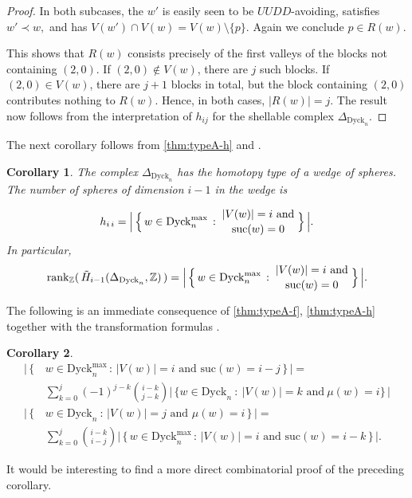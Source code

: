 \documentclass[11pt]{amsart}
\def\Dyck{\mathrm{Dyck}}
\def\rk{\mathrm{rank}}
\def\ZZ{\mathbb{Z}}
\def\suc{\mathrm{suc}}
\theoremstyle{plain}
\numberwithin{lemma}{\DefaultNumberTheoremWithin}
\numberwithin{theorem}{\DefaultNumberTheoremWithin}
\newtheorem{corollary}{Corollary}
\numberwithin{corollary}{\DefaultNumberTheoremWithin}
\numberwithin{proposition}{\DefaultNumberTheoremWithin}
\numberwithin{conjecture}{\DefaultNumberTheoremWithin}
\theoremstyle{definition}
\numberwithin{definition}{\DefaultNumberTheoremWithin}
\numberwithin{question}{\DefaultNumberTheoremWithin}
\numberwithin{problem}{\DefaultNumberTheoremWithin}
\theoremstyle{remark}
\numberwithin{remark}{\DefaultNumberTheoremWithin}
\numberwithin{example}{\DefaultNumberTheoremWithin}
\numberwithin{claim}{\DefaultNumberTheoremWithin}
\begin{document}
\begin{proof}
In both subcases, the $w'$ is easily seen to be $UUDD$-avoiding,
satisfies
$w'\prec w,$
and has
$V(w')\cap V(w)=V(w)\setminus\{p\}.$
Again we conclude $p\in R(w)$.

This shows that $R(w)$ consists precisely of the first valleys
of the blocks not containing $(2,0)$. If $(2,0)\notin V(w)$,
there are $j$ such blocks. If $(2,0)\in V(w)$, there are $j+1$
blocks in total, but the block containing $(2,0)$ contributes
nothing to $R(w)$. Hence, in both cases,
$|R(w)|=j.$
The result now follows from the interpretation of
$h_{ij}$ for the shellable complex $\Delta_{\Dyck_n}$.
\end{proof}

The next corollary follows from \ref{thm:typeA-h} and \cite[Theorem 4.1]{BjoWac96}.

\begin{corollary}
    The complex $\Delta_{\Dyck_n}$ has the homotopy type of a wedge of spheres. 
    The number of spheres of dimension $i-1$ in the wedge is
    
    $$h_{i\,i}=\Big|\,\Big\{\,w\in \Dyck_n^{\max}\,:\,\genfrac{}{}{0pt}{}{|V(w)|=i \text{ and}}{\suc(w) = 0} \,\Big\}\,\Big|.$$
    In particular, $$\rk_\ZZ(\,\tilde{H}_{i-1}(\Delta_{\Dyck_n},\ZZ)\,)=
    \Big|\,\Big\{\,w\in \Dyck_n^{\max}\,:\,\genfrac{}{}{0pt}{}{|V(w)|=i \text{ and}}{\suc(w) = 0} \,\Big\}\,\Big|.$$
\end{corollary}

The following is an immediate consequence of \ref{thm:typeA-f}, \ref{thm:typeA-h} together with
the transformation formulas \cite[Definition 3.1,(3.4)]{BjoWac96}.

\begin{corollary} \label{cor:fh-ident}
\begin{align*}
     \Big|\,\Big\{\,&w \in \Dyck_{n}^{\max}\, :\, |V(w)| = i \text{ and } \suc(w) = i - j \,\Big\}\,\Big|  = \\ & \sum_{k=0}^ j (-1)^ {j-k} \binom{i-k}{j-k}  \Big|\,\Big\{ w \in \Dyck_n~:~|V(w)| = k \text{ and}\ \mu(w)=i \Big\}\,\Big|\\
    \Big|\,\Big\{\,& w \in \Dyck_n~:\, |V(w)| = j  \text{ and } \mu(w)=i\, \Big\}\,\Big|  = \\
     & \sum_{k=0}^j \binom{i-k}{i-j}  \Big|\,\Big\{\,w \in \Dyck_{n}^{\max}\, :\,  |V(w)| = i \text{ and } \suc(w) = i - k \,\Big\}\,\Big|.
    \end{align*}
\end{corollary}

It would be interesting to find a more direct combinatorial proof of the preceding corollary.
\end{document}
